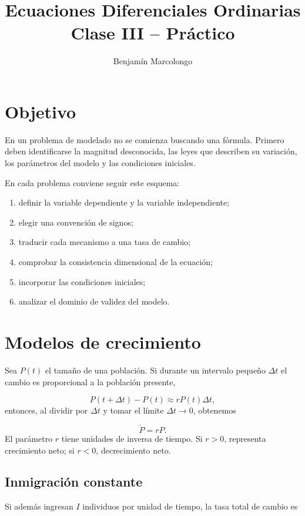 \documentclass[12pt,a4paper]{article}
\title{Ecuaciones Diferenciales Ordinarias\\Clase III -- Práctico}
\author{Benjamín Marcolongo}
\date{}
\begin{document}
	\maketitle

	\section*{Objetivo}

	En un problema de modelado no se comienza buscando una fórmula. Primero deben identificarse la magnitud desconocida, las leyes que describen su variación, los parámetros del modelo y las condiciones iniciales.

	En cada problema conviene seguir este esquema:

	\begin{enumerate}[label=\arabic*.]
		\item definir la variable dependiente y la variable independiente;
		\item elegir una convención de signos;
		\item traducir cada mecanismo a una tasa de cambio;
		\item comprobar la consistencia dimensional de la ecuación;
		\item incorporar las condiciones iniciales;
		\item analizar el dominio de validez del modelo.
	\end{enumerate}

	\clearpage
	\section{Modelos de crecimiento}

	Sea \(P(t)\) el tamaño de una población. Si durante un intervalo pequeño \(\Delta t\) el cambio es proporcional a la población presente,

	\[
	P(t+\Delta t)-P(t)
	\approx
	rP(t)\Delta t,
	\]
	entonces, al dividir por \(\Delta t\) y tomar el límite \(\Delta t\to0\), obtenemos

	\[
	\boxed{\dot P=rP.}
	\]
	El parámetro \(r\) tiene unidades de inversa de tiempo. Si \(r>0\), representa crecimiento neto; si \(r<0\), decrecimiento neto.

	\subsection{Inmigración constante}

	Si además ingresan \(I\) individuos por unidad de tiempo, la tasa total de cambio es
\end{document}

